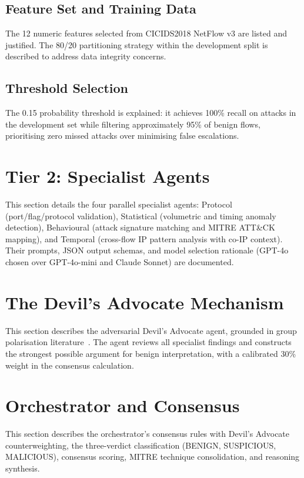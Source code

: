 \documentclass[12pt,openany,oneside,a4paper]{book}
\begin{document}
\subsection{Feature Set and Training Data}
\label{sec:feature-set-training}
The 12 numeric features selected from CICIDS2018 NetFlow v3 are listed and justified. The 80/20 partitioning strategy within the development split is described to address data integrity concerns.

\subsection{Threshold Selection}
\label{sec:threshold-selection}
The 0.15 probability threshold is explained: it achieves 100\% recall on attacks in the development set while filtering approximately 95\% of benign flows, prioritising zero missed attacks over minimising false escalations.

\section{Tier 2: Specialist Agents}
\label{sec:tier2-specialists}
This section details the four parallel specialist agents: Protocol (port/flag/protocol validation), Statistical (volumetric and timing anomaly detection), Behavioural (attack signature matching and MITRE ATT\&CK mapping), and Temporal (cross-flow IP pattern analysis with co-IP context). Their prompts, JSON output schemas, and model selection rationale (GPT-4o chosen over GPT-4o-mini and Claude Sonnet) are documented.

\section{The Devil's Advocate Mechanism}
\label{sec:devils-advocate}
This section describes the adversarial Devil's Advocate agent, grounded in group polarisation literature~\autocite{Sunstein2002}. The agent reviews all specialist findings and constructs the strongest possible argument for benign interpretation, with a calibrated 30\% weight in the consensus calculation.

\section{Orchestrator and Consensus}
\label{sec:orchestrator-consensus}
This section describes the orchestrator's consensus rules with Devil's Advocate counterweighting, the three-verdict classification (BENIGN, SUSPICIOUS, MALICIOUS), consensus scoring, MITRE technique consolidation, and reasoning synthesis.
\end{document}
